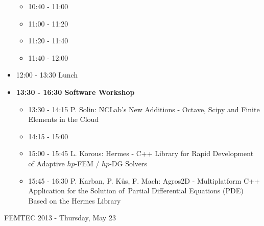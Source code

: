 \documentclass[10pt, A4]{article}%
\begin{document}
\begin{itemize}
  \begin{itemize}
    \item 10:40 - 11:00 
    \item 11:00 - 11:20 
    \item 11:20 - 11:40 
    \item 11:40 - 12:00 
  \end{itemize}
  \item 12:00 - 13:30 Lunch
  \item {\bf 13:30 - 16:30 Software Workshop}
  \begin{itemize}
    \item 13:30 - 14:15 P. Solin: NCLab's New Additions - Octave, Scipy and Finite Elements in the Cloud
    \item 14:15 - 15:00 
    \item 15:00 - 15:45 L. Korous: Hermes - C++ Library for Rapid Development of Adaptive $hp$-FEM / $hp$-DG Solvers
    \item 15:45 - 16:30 P. Karban, P. K\r{u}s, F. Mach: Agros2D - Multiplatform C++ Application for the Solution of~Partial Differential Equations (PDE) Based on the Hermes Library
  \end{itemize}
\end{itemize}

\newpage
\newpage

\centerline{\huge FEMTEC 2013 - Thursday, May 23}
\vspace{4mm}
\end{document}
